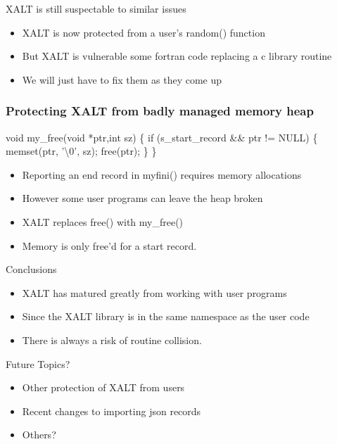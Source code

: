 \documentclass{beamer}
\begin{document}
\begin{frame}{XALT is still suspectable to similar issues}
  \begin{itemize}
    \item XALT is now protected from a user's random() function
    \item But XALT is vulnerable some fortran code replacing a c
      library routine
    \item We will just have to fix them as they come up
  \end{itemize}
\end{frame}


\begin{frame}[fragile]
    \frametitle{Protecting XALT from badly managed memory heap}
 {\small
    \begin{semiverbatim}
void my\_free(void *ptr,int sz)
\{
  if (s\_start\_record \&\& ptr != NULL)
    \{
      memset(ptr, '\textbackslash{}0', sz);
      free(ptr);
    \}
\}
    \end{semiverbatim}
}
  \begin{itemize}
    \item Reporting an end record in myfini() requires memory
      allocations
    \item However some user programs can leave the heap broken
    \item XALT replaces free() with my\_free()
    \item Memory is only free'd for a start record.
  \end{itemize}
\end{frame}

\begin{frame}{Conclusions}
  \begin{itemize}
    \item XALT has matured greatly from working with user programs
    \item Since the XALT library is in the same namespace as the user code 
    \item There is always a risk of routine collision.
  \end{itemize}
\end{frame}


\begin{frame}{Future Topics?}
  \begin{itemize}
    \item Other protection of XALT from users
    \item Recent changes to importing json records
    \item Others?
  \end{itemize}
\end{frame}
%

%
\end{document}
